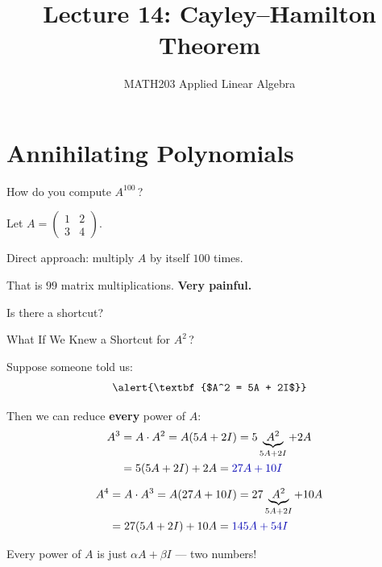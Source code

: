 \documentclass[10pt]{beamer}
\title{Lecture 14: Cayley--Hamilton Theorem}
\subtitle{MATH203 Applied Linear Algebra}
\date{}
\theoremstyle{definition}
\newcommand{\x}[1]{\alert{\textbf{#1}}}
\newcommand{\bl}[1]{{\color{blue!70!black}#1}}
\begin{document}
\maketitle


\section{Annihilating Polynomials}


\begin{frame}{}
\vfill
\begin{center}
{\Large How do you compute $A^{100}$\,?}
\end{center}
\vfill

Let $A = \begin{pmatrix} 1 & 2 \\ 3 & 4 \end{pmatrix}$.

\vfill

Direct approach: multiply $A$ by itself $100$ times.

\vfill

That is $99$ matrix multiplications. \x{Very painful.}

\vfill

Is there a shortcut?

\vfill
\end{frame}


\begin{frame}{What If We Knew a Shortcut for $A^2$\,?}

Suppose someone told us:
$$\x{$A^2 = 5A + 2I$}$$

\vfill

Then we can reduce \x{every} power of $A$:
\begin{align*}
A^3 &= A \cdot A^2 = A(5A + 2I) = 5\underbrace{A^2}_{5A+2I} + 2A\\
    &= 5(5A + 2I) + 2A = \bl{27A + 10I}
\end{align*}

\vfill

\begin{align*}
A^4 &= A \cdot A^3 = A(27A + 10I) = 27\underbrace{A^2}_{5A+2I} + 10A\\
    &= 27(5A + 2I) + 10A = \bl{145A + 54I}
\end{align*}

\vfill

Every power of $A$ is just $\alpha A + \beta I$ --- two numbers!
\vfill
\end{frame}
\end{document}
